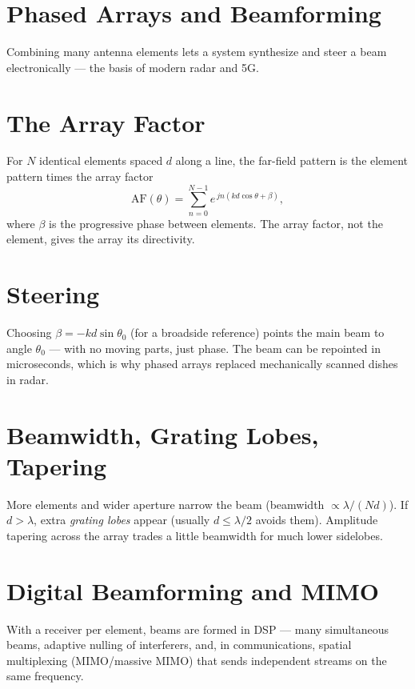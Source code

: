 \section{Phased Arrays and Beamforming}\label{sec:tb_beamforming}



Combining many antenna elements lets a system synthesize and steer a beam
electronically --- the basis of modern radar and 5G.

\section{The Array Factor}
For $N$ identical elements spaced $d$ along a line, the far-field pattern is the
element pattern times the array factor
\[ \text{AF}(\theta) = \sum_{n=0}^{N-1} e^{\,j n (k d \cos\theta + \beta)}, \]
where $\beta$ is the progressive phase between elements. The array factor, not the
element, gives the array its directivity.

\section{Steering}
Choosing $\beta = -k d \sin\theta_0$ (for a broadside reference) points the main
beam to angle $\theta_0$ --- with no moving parts, just phase. The beam can be
repointed in microseconds, which is why phased arrays replaced mechanically
scanned dishes in radar.

\section{Beamwidth, Grating Lobes, Tapering}
More elements and wider aperture narrow the beam (beamwidth $\propto \lambda/(Nd)$).
If $d>\lambda$, extra \emph{grating lobes} appear (usually $d\le\lambda/2$ avoids
them). Amplitude tapering across the array trades a little beamwidth for much lower
sidelobes.

\section{Digital Beamforming and MIMO}
With a receiver per element, beams are formed in DSP --- many simultaneous beams,
adaptive nulling of interferers, and, in communications, spatial multiplexing
(MIMO/massive MIMO) that sends independent streams on the same frequency.



